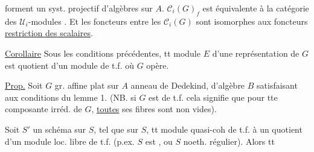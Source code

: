 
forment un syst. projectif  d'algèbres sur $A$.
$\mathcal C_i(G)_f$ est équivalente  à la catégorie des $\mathcal U_i$-modules . Et les foncteurs  entre les $\mathcal C_i(G)$ sont isomorphes aux  foncteurs \uline{restriction des scalaires}.

\uline{Corollaire} Sous les conditions précédentes, tt module  $E$ d'une représentation de $G$ est quotient d'un module  de t.f. où $G$ opère.

\uline{Prop.} Soit $G$ gr. affine plat sur $A$ anneau de Dedekind, d'algèbre $B$ satisfaisant aux conditions du lemme 1. (NB. si $G$ est de t.f. cela signifie que pour tte composante irréd. de $G$, \uline{toutes} ses fibres sont non vides).

Soit  $S'$ un schéma sur $S$, tel que sur $S$, tt module quasi-coh de t.f.   à un quotient d'un module loc. libre de t.f.  (p.ex. $S$ est  , ou $S$ noeth. régulier). Alors tt

